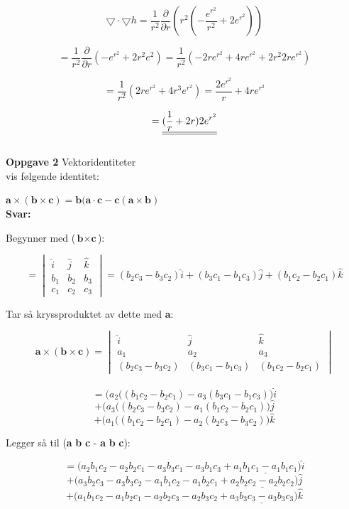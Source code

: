 \documentclass[a4paper,norsk,12pt]{article}
\begin{document}
$$
\bigtriangledown \cdot \bigtriangledown h = \frac{1}{r^2} \frac{\partial}{\partial r} (r^2 (- \frac{e^{r^2}}{r^2} + 2 e^{r^2}))
$$

$$
= \frac{1}{r^2} \frac{\partial}{\partial r} (-e^{r^2} +2 r^2 e^2) = \frac{1}{r^2} (-2re^{r^2} + 4 r e^{r^2} + 2r^2 2re^{r^2})
$$

$$
=\frac{1}{r^2} (2re^{r^2} + 4r^3 e^{r^2}) = \frac{2 e^{r^2}}{r} + 4re^{r^2}
$$

$$
\def\doubleunderline#1{\underline{\underline{#1}}}
=\doubleunderline{(\frac{1}{r} + 2r)2e^{r^2}}
$$\\


\textbf{Oppgave 2} \hspace{3mm}  Vektoridentiteter \\

vis følgende identitet:

$ \textbf{a} \times (\textbf{b} \times \textbf{c} ) = \textbf{b}(\textbf{a} \cdot \textbf{c} - \textbf{c}(\textbf{a} \times \textbf{b}) $\\

\textbf{Svar:}

Begynner med ($ \textbf{b} \times \textbf{c} $):

$$  
=\begin{vmatrix}
\hat i & \hat j & \hat k \\
{b_1} & {b_2} & {b_3} \\
{c_1} & {c_2} & {c_3}
\end{vmatrix}
= (b_2 c_3 - b_3 c_2) \hat i + (b_3 c_1 - b_1 c_3)\hat j + (b_1 c_2 - b_2 c_1) \hat k
$$

Tar så kryssproduktet av dette med \textbf{a}:

$$  
\textbf{a} \times (\textbf{b} \times \textbf{c} ) 
=\begin{vmatrix}
\hat i & \hat j & \hat k \\
{a_1} & {a_2} & {a_3} \\
(b_2 c_3 - b_3 c_2) & (b_3 c_1 - b_1 c_3) & (b_1 c_2 - b_2 c_1)
\end{vmatrix}
$$\\
$$
=\Big(a_2((b_1 c_2 - b_2 c_1) - a_3(b_3 c_1 - b_1 c_3)  \Big) \hat i 
$$
$$
+ \Big(a_3((b_2 c_3 - b_3 c_2) - a_1(b_1 c_2 - b_2 c_1)  \Big) \hat j
$$
$$
+ \Big(a_1((b_1 c_2 - b_2 c_1) - a_2(b_2 c_3 - b_3 c_2)  \Big) \hat k
$$

Legger så til (\textbf{a} \textbf{b} \textbf{c} - \textbf{a} \textbf{b} \textbf{c}):

$$
=\Big(a_2 b_1 c_2 - a_2 b_2 c_1 - a_3 b_3 c_1 - a_3 b_1 c_3 + \underline{a_1 b_1 c_1 - a_1 b_1 c_1}  \Big) \hat i 
$$
$$
+\Big(a_3 b_2 c_3 - a_3 b_3 c_2 - a_1 b_1 c_2 - a_1 b_2 c_1 + \underline{a_2 b_2 c_2 - a_2 b_2 c_2}  \Big) \hat j 
$$
$$
+\Big(a_1 b_1 c_2 - a_1 b_2 c_1 - a_2 b_2 c_3 - a_2 b_3 c_2 + \underline{a_3 b_3 c_3 - a_3 b_3 c_3}  \Big) \hat k 
$$
\end{document}
